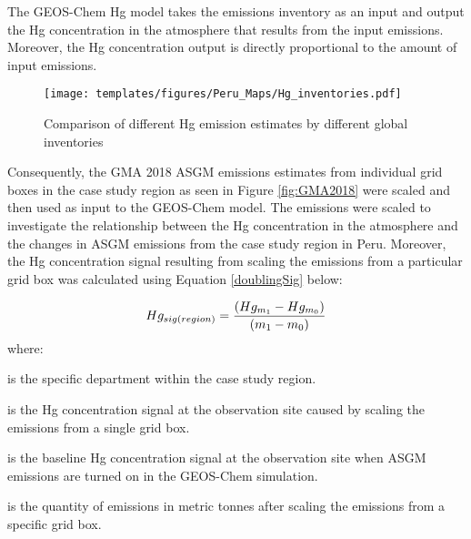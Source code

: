 \begin{flushleft}
The GEOS-Chem Hg model takes the emissions inventory as an input and output the Hg concentration in the atmosphere that results from the input emissions. Moreover, the Hg concentration output is directly proportional to the amount of input emissions. 
\end{flushleft}
\begin{figure}[H]
  \texttt{[image: templates/figures/Peru\_Maps/Hg\_inventories.pdf]}
  \centering
  \caption{Comparison of different Hg emission estimates by different global inventories}
  \label{fig:Hg_inventories}
  
\end{figure}
\FloatBarrier
\begin{flushleft}
Consequently, the GMA 2018 ASGM emissions estimates from individual grid boxes in the case study region as seen in Figure \ref{fig:GMA2018} were scaled and then used as input to the GEOS-Chem model. The emissions were scaled to investigate the relationship between the Hg concentration in the atmosphere and the changes in ASGM emissions from the case study region in Peru. Moreover, the Hg concentration signal resulting from scaling the emissions from a particular grid box was calculated using Equation \ref{doublingSig} below:
\end{flushleft}

\begin{flushleft}
\begin{equation}
\label{doublingSig}
Hg_{sig(region)}=\small\frac{(Hg_{m_1} -Hg_{m_0})}{(m_1 -m_0)}
\end{equation}
where:
\end{flushleft}

\begin{description}[leftmargin=!,labelwidth={3 em}]
    \item [$region$] is the specific department within the case study region.
    \item [$Hg_{m_1}$] is the Hg concentration signal at the observation site caused by scaling the emissions from a single grid box. 
    \item [$Hg_{m_0}$] is the baseline Hg concentration signal at the observation site when ASGM emissions are turned on in the GEOS-Chem simulation.
    \item [$m_1$] is the quantity of emissions in metric tonnes after scaling the emissions from a specific grid box.
\end{description}


